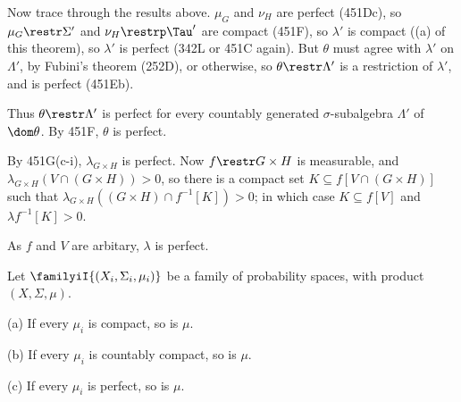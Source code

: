 {Now trace through the results above.   $\mu_G$ and $\nu_H$ are perfect
(451Dc), so $\mu_G\restr\Sigma'$ and $\nu_H\restrp\Tau'$ are compact
(451F), so $\lambda'$ is
compact ((a) of this theorem), so $\lambda'$ is perfect
(342L or 451C again).
But $\theta$ must agree with $\lambda'$ on $\Lambda'$, by Fubini's
theorem (252D), or otherwise, so $\theta\restr\Lambda'$ is a restriction
of $\lambda'$, and is perfect (451Eb).

Thus $\theta\restr\Lambda'$ is perfect for every countably generated
$\sigma$-subalgebra $\Lambda'$ of $\dom\theta$.   By 451F, $\theta$ is
perfect.\ \Qed

\medskip

 By 451G(c-i), $\lambda_{G\times H}$ is perfect.   Now
$f\restr G\times H$ is measurable, and $\lambda_{G\times
H}(V\cap(G\times H))>0$, so there is a compact set $K\subseteq
f[V\cap(G\times H)]$ such that
$\lambda_{G\times H}((G\times H)\cap f^{-1}[K])>0$;  in which case
$K\subseteq f[V]$ and $\lambda f^{-1}[K]>0$.

As $f$ and $V$ are arbitary, $\lambda$ is perfect.
}%

 Let $\familyiI{(X_i,\Sigma_i,\mu_i)}$ be a family
of probability spaces, with product $(X,\Sigma,\mu)$.

(a) If every $\mu_i$ is compact, so is $\mu$.

(b) 
If every $\mu_i$ is countably compact, so is $\mu$.

(c) If every $\mu_i$ is perfect, so is $\mu$.

